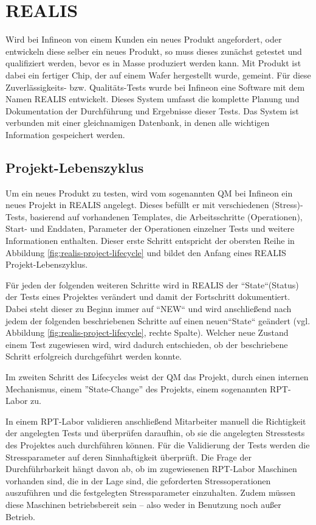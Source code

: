 \section{REALIS}\label{Sec:REALIS}
Wird bei Infineon von einem Kunden ein neues Produkt angefordert, oder entwickeln diese selber ein neues Produkt, so muss dieses zunächst getestet und qualifiziert werden, bevor es in Masse produziert werden kann. Mit Produkt ist dabei ein fertiger Chip, der auf einem Wafer hergestellt wurde, gemeint. Für diese Zuverlässigkeits- bzw. Qualitäts-Tests wurde bei Infineon eine Software mit dem Namen \gls{REALIS} entwickelt. Dieses System umfasst die komplette Planung und Dokumentation der Durchführung und Ergebnisse dieser Tests. Das System ist verbunden mit einer gleichnamigen Datenbank, in denen alle wichtigen Information gespeichert werden.

\subsection{Projekt-Lebenszyklus}\label{Subsec:project-lifecycle}
Um ein neues Produkt zu testen, wird vom sogenannten \gls{QM} bei Infineon ein neues Projekt in \gls{REALIS} angelegt. Dieses befüllt er mit verschiedenen (Stress)-Tests, basierend auf vorhandenen Templates, die Arbeitsschritte (Operationen), Start- und Enddaten, Parameter der Operationen einzelner Tests und weitere Informationen enthalten. Dieser erste Schritt entspricht der obersten Reihe in Abbildung \ref{fig:realis-project-lifecycle} und bildet den Anfang eines REALIS Projekt-Lebenszyklus. 

Für jeden der folgenden weiteren Schritte wird in \gls{REALIS} der ``State``(Status) der Tests eines Projektes verändert und damit der Fortschritt dokumentiert. Dabei steht dieser zu Beginn immer auf  ``NEW`` und wird anschließend nach jedem der folgenden beschriebenen Schritte auf einen neuen``State`` geändert (vgl. Abbildung \ref{fig:realis-project-lifecycle}, rechte Spalte). Welcher neue Zustand einem Test zugewiesen wird, wird dadurch entschieden, ob der beschriebene Schritt erfolgreich durchgeführt werden konnte.

Im zweiten Schritt des Lifecycles weist der \gls{QM} das Projekt, durch einen internen Mechanismus, einem ''State-Change'' des Projekts, einem sogenannten  \gls{RPT}-Labor zu. 

In einem \gls{RPT}-Labor validieren anschließend Mitarbeiter manuell die Richtigkeit der angelegten Tests und überprüfen daraufhin, ob sie die angelegten Stresstests des Projektes auch durchführen können. 
Für die Validierung der Tests werden die Stressparameter auf deren Sinnhaftigkeit überprüft. Die Frage der Durchführbarkeit hängt davon ab, ob im zugewiesenen \gls{RPT}-Labor Maschinen vorhanden sind, die in der Lage sind, die geforderten Stressoperationen auszuführen und die festgelegten Stressparameter einzuhalten. Zudem müssen diese Maschinen betriebsbereit sein – also weder in Benutzung noch außer Betrieb.

